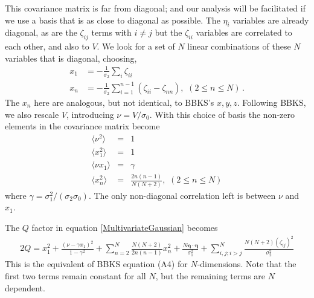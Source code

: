 \documentclass[12pt]{article}
\begin{document}
This covariance matrix is far from diagonal; and our analysis will be facilitated if we use a basis that is as close to diagonal as possible. The $\eta_i$ variables are already diagonal, as are the $\zeta_{ij}$ terms with $i\neq j$ but the $\zeta_{ii}$ variables are correlated to each other, and also  to $V$. We look for a set of $N$ linear combinations of these $N$ variables that is diagonal, choosing,
\begin{align}
\label{BasisTransform}
x_1 &= -\frac{1}{\sigma_2}\sum_i\zeta_{ii} \nonumber \\
x_n &= -\frac{1}{\sigma_2}\sum_{i=1}^{n-1}\left(\zeta_{ii}-\zeta_{nn}\right),\,\, (2\leq n \leq N) \, .
\end{align}
%
The $x_n$ here are analogous, but not identical, to BBKS's $x, y, z$. Following BBKS, we also rescale $V$, introducing $\nu = V/\sigma_0$. With this choice of basis the non-zero elements in the covariance matrix become
%
\begin{eqnarray}
  \langle\nu^2\rangle &=& 1 \nonumber\\
  \langle x_1^2\rangle&=&1 \\
  \langle\nu x_1\rangle &=& \gamma \nonumber\\
  \langle x_n^2 \rangle &=& \frac{2n(n-1)}{N(N+2)},\,\, (2\leq n \leq N) \nonumber
\end{eqnarray}
%
\noindent where $\gamma = \sigma_1^2/(\sigma_2 \sigma_0)$. The only non-diagonal correlation left is between $\nu$ and $x_1$.

The $Q$ factor in equation \eqref{MultivariateGaussian} becomes
%
\begin{equation} \label{Q}
\begin{split}
2Q = x_1^2 + \frac{(\nu-\gamma x_1)^2}{1-\gamma^2}+\sum_{n=2}^N\frac{N(N+2)}{2n(n-1)}x_n^2 + \frac{N \pmb{\eta}\cdot \pmb{\eta}}{\sigma_1^2} + \sum_{i,j;i > j}^N\frac{N(N+2)(\zeta_{ij})^2}{\sigma_2^2}
\end{split}
\end{equation}
%
This is the equivalent of BBKS equation (A4) for $N$-dimensions. Note that the first two terms remain constant for all $N$, but the remaining terms are $N$ dependent.
\end{document}
